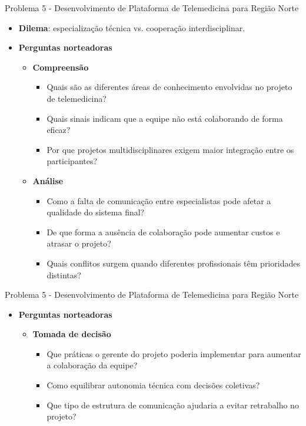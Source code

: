 \documentclass{beamer}
\begin{document}
\begin{frame}{Problema 5 - Desenvolvimento de Plataforma de Telemedicina para Região Norte}
	\begin{itemize}
		\justifying
		\item \textbf{Dilema}: especialização técnica vs. cooperação interdisciplinar.
		\item \textbf{Perguntas norteadoras}
		\begin{itemize}
			\item \textbf{Compreensão}
				\begin{itemize}
					\justifying
					\item Quais são as diferentes áreas de conhecimento envolvidas no projeto de telemedicina?
					\item Quais sinais indicam que a equipe não está colaborando de forma eficaz?
					\item Por que projetos multidisciplinares exigem maior integração entre os participantes?
				\end{itemize}
			\item \textbf{Análise}
				\begin{itemize}
					\justifying
					\item Como a falta de comunicação entre especialistas pode afetar a qualidade do sistema final?
					\item De que forma a ausência de colaboração pode aumentar custos e atrasar o projeto?
					\item Quais conflitos surgem quando diferentes profissionais têm prioridades distintas?
				\end{itemize}
		\end{itemize}
	\end{itemize}
\end{frame}

\begin{frame}{Problema 5 - Desenvolvimento de Plataforma de Telemedicina para Região Norte}
	\begin{itemize}
		\justifying
		\item \textbf{Perguntas norteadoras}
		\begin{itemize}
			\item \textbf{Tomada de decisão}
			\begin{itemize}
				\justifying
				\item Que práticas o gerente do projeto poderia implementar para aumentar a colaboração da equipe?
				\item Como equilibrar autonomia técnica com decisões coletivas?
				\item Que tipo de estrutura de comunicação ajudaria a evitar retrabalho no projeto?
			\end{itemize}
		\end{itemize}
	\end{itemize}
\end{frame}
\end{document}
